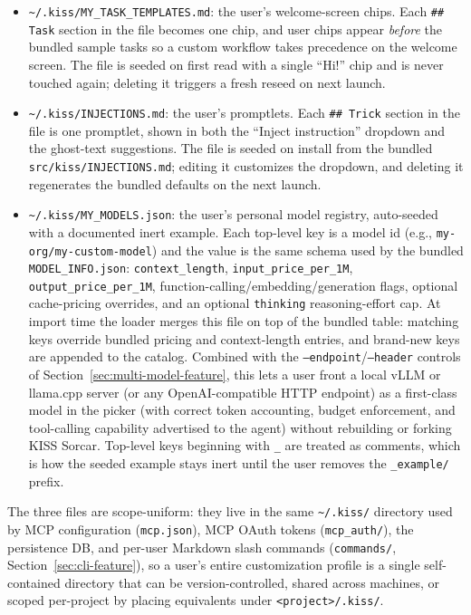 \documentclass{article}
\begin{document}
\begin{itemize}[leftmargin=*,topsep=2pt,parsep=0pt]
\item \texttt{\textasciitilde/.kiss/MY\_TASK\_TEMPLATES.md}: the user's welcome-screen chips.  Each \texttt{\#\# Task} section in the file becomes one chip, and user chips appear \emph{before} the bundled sample tasks so a custom workflow takes precedence on the welcome screen.  The file is seeded on first read with a single ``Hi!'' chip and is never touched again; deleting it triggers a fresh reseed on next launch.
\item \texttt{\textasciitilde/.kiss/INJECTIONS.md}: the user's promptlets.  Each \texttt{\#\# Trick} section in the file is one promptlet, shown in both the ``Inject instruction'' dropdown and the ghost-text suggestions.  The file is seeded on install from the bundled \texttt{src/kiss/INJECTIONS.md}; editing it customizes the dropdown, and deleting it regenerates the bundled defaults on the next launch.
\item \texttt{\textasciitilde/.kiss/MY\_MODELS.json}: the user's personal model registry, auto-seeded with a documented inert example.  Each top-level key is a model id (e.g., \texttt{my-org/my-custom-model}) and the value is the same schema used by the bundled \texttt{MODEL\_INFO.json}: \texttt{context\_length}, \texttt{input\_price\_per\_1M}, \texttt{output\_price\_per\_1M}, function-calling/embedding/generation flags, optional cache-pricing overrides, and an optional \texttt{thinking} reasoning-effort cap.  At import time the loader merges this file on top of the bundled table: matching keys override bundled pricing and context-length entries, and brand-new keys are appended to the catalog.  Combined with the \texttt{--endpoint}/\texttt{--header} controls of Section~\ref{sec:multi-model-feature}, this lets a user front a local vLLM or llama.cpp server (or any OpenAI-compatible HTTP endpoint) as a first-class model in the picker (with correct token accounting, budget enforcement, and tool-calling capability advertised to the agent) without rebuilding or forking KISS Sorcar.  Top-level keys beginning with \texttt{\_} are treated as comments, which is how the seeded example stays inert until the user removes the \texttt{\_example/} prefix.
\end{itemize}

The three files are scope-uniform: they live in the same \texttt{\textasciitilde/.kiss/} directory used by MCP configuration (\texttt{mcp.json}), MCP OAuth tokens (\texttt{mcp\_auth/}), the persistence DB, and per-user Markdown slash commands (\texttt{commands/}, Section~\ref{sec:cli-feature}), so a user's entire customization profile is a single self-contained directory that can be version-controlled, shared across machines, or scoped per-project by placing equivalents under \texttt{<project>/.kiss/}.
\end{document}
